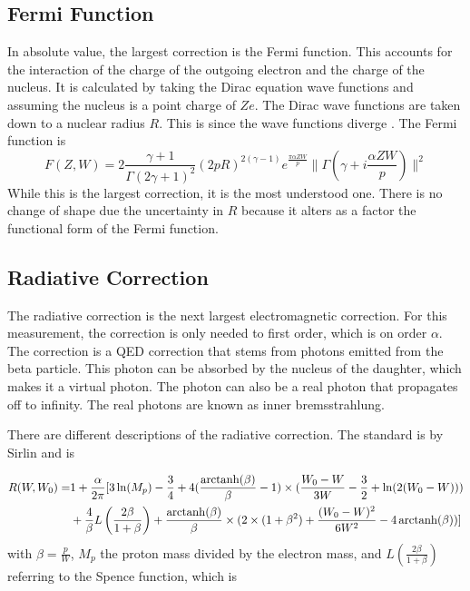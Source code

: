\documentclass[../MaxHughesThesis.tex]{subfiles}
\begin{document}
\subsection{Fermi Function}

In absolute value, the largest correction is the Fermi function.
This accounts for the interaction of the charge of the outgoing electron and the charge of the nucleus.
It is calculated by taking the Dirac equation wave functions and assuming the nucleus is a point charge of $Ze$.
The Dirac wave functions are taken down to a nuclear radius $R$.
This is since the wave functions diverge \cite{Wil89}.
The Fermi function is %
\begin{equation}
	F(Z,W) = 2\frac{\gamma + 1}{\Gamma(2\gamma +1)^{2}}(2pR)^{2(\gamma - 1)}e^{\frac{\pi\alpha ZW}{p}}\|\Gamma(\gamma + i\frac{\alpha ZW}{p})\|^{2}
	\label{eq:fermifunc}
\end{equation}
While this is the largest correction, it is the most understood one.
There is no change of shape due the uncertainty in $R$ because it alters as a factor the functional form of the Fermi function. 

\subsection{Radiative Correction}
The radiative correction is the next largest electromagnetic correction.
For this measurement, the correction is only needed to first order, which is on order $\alpha$.
The correction is a QED correction that stems from photons emitted from the beta particle.
This photon can be absorbed by the nucleus of the daughter, which makes it a virtual photon.
The photon can also be a real photon that propagates off to infinity.
The real photons are known as inner bremsstrahlung.

There are different descriptions of the radiative correction.  
The standard is by Sirlin \cite{Sir67} and is %

\begin{equation}
	\label{eq:sirlinrad}
	\begin{split}
	R(W,W_{0}) = & 1 + \frac{\alpha}{2\pi}[3\ln(M_{p}) - \frac{3}{4} + 4(\frac{\operatorname{arctanh}(\beta)}{\beta} - 1)\times(\frac{W_{0} - W}{3W} - \frac{3}{2} + \ln(2(W_{0} - W))) \\
	 & + \frac{4}{\beta}L \left(\frac{2\beta}{1 + \beta}\right) + \frac{\operatorname{arctanh}(\beta)}{\beta}\times(2\times(1 + \beta^{2}) + \frac{(W_{0} - W)^{2}}{6W^{2}} - 4 \operatorname{arctanh}(\beta))]
	\end{split}
\end{equation} 
with $\beta = \frac{p}{W}$, $M_{p}$ the proton mass divided by the electron mass, and $L(\frac{2\beta}{1+\beta})$ referring to the Spence function, which is \cite{Wil95} %
\end{document}
